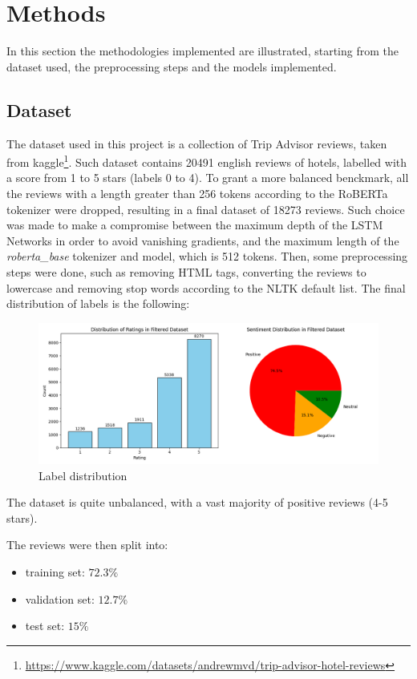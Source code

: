 \section{Methods}
\label{sec:methods}    
    In this section the methodologies implemented are illustrated, starting from the
    dataset used, the preprocessing steps and the models implemented.

    \subsection{Dataset}
    \label{subsec:dataset}
        The dataset used in this project is a collection of Trip Advisor reviews, taken
        from kaggle\footnote{\url{https://www.kaggle.com/datasets/andrewmvd/trip-advisor-hotel-reviews}}.
        Such dataset contains 20491 english reviews of hotels, labelled with a score from
        1 to 5 stars (labels 0 to 4). To grant a more balanced benckmark, all the reviews with a
        length greater than 256 tokens according to the RoBERTa tokenizer were 
        dropped, resulting in a final dataset of 18273 reviews. Such choice was
        made to make a compromise between the maximum depth of the LSTM Networks
        in order to avoid vanishing gradients, and the maximum length of the
        \textit{roberta\_base} tokenizer and model, which is 512 tokens. Then, some preprocessing
        steps were done, such as removing HTML tags, converting the reviews to 
        lowercase and removing stop words according to the NLTK default list. 
        The final distribution of labels is the following:
        \begin{figure} [H]
            \centering
            \includegraphics[width=\textwidth]{images/label_distribution.png}
            \caption{Label distribution}
        \end{figure}
        The dataset is quite unbalanced, with a vast majority of positive reviews (4-5 stars). 

        The reviews were then split into:
        \begin{itemize}
            \item training set: $72.3\%$
            \item validation set: $12.7\%$
            \item test set: $15\%$
        \end{itemize}

